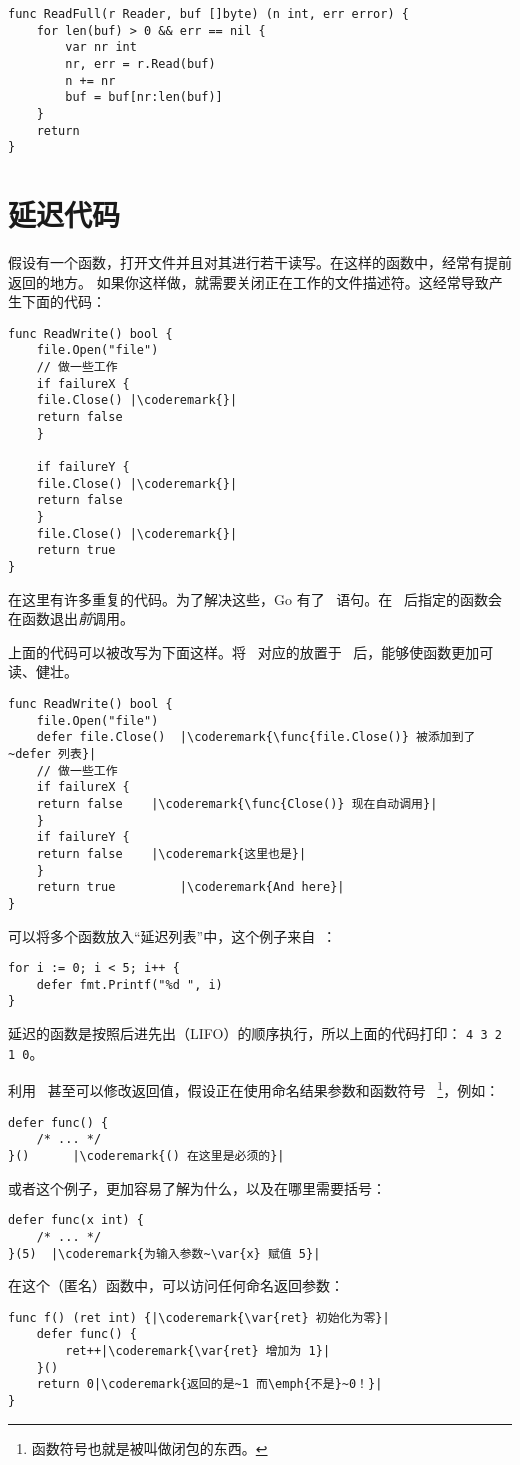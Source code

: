 \begin{lstlisting}
func ReadFull(r Reader, buf []byte) (n int, err error) {
    for len(buf) > 0 && err == nil {
        var nr int
        nr, err = r.Read(buf)
        n += nr
        buf = buf[nr:len(buf)]
    }
    return
}
\end{lstlisting}

\section{延迟代码}
\label{sec:deferred code}
假设有一个函数，打开文件并且对其进行若干读写。在这样的函数中，经常有提前返回的地方。
如果你这样做，就需要关闭正在工作的文件描述符。这经常导致产生下面的代码：
\begin{lstlisting}[caption=没有 defer]
func ReadWrite() bool {
    file.Open("file")
    // 做一些工作
    if failureX {
	file.Close() |\coderemark{}|
	return false
    }

    if failureY {
	file.Close() |\coderemark{}|
	return false
    }
    file.Close() |\coderemark{}|
    return true
}
\end{lstlisting}
在这里有许多重复的代码。为了解决这些，Go 有了~ 
语句。在~ 后指定的函数会在函数退出\emph{前}调用。

上面的代码可以被改写为下面这样。将~ 对应的放置于~ 
后，能够使函数更加可读、健壮。
\begin{lstlisting}[caption=有 defer]
func ReadWrite() bool {
    file.Open("file")
    defer file.Close()	|\coderemark{\func{file.Close()} 被添加到了~defer 列表}|
    // 做一些工作
    if failureX {
	return false    |\coderemark{\func{Close()} 现在自动调用}|
    }
    if failureY {
	return false    |\coderemark{这里也是}|
    }
    return true         |\coderemark{And here}|
}
\end{lstlisting}
可以将多个函数放入``延迟列表''中，这个例子来自~\cite{effective_go}：
\begin{lstlisting}
for i := 0; i < 5; i++ { 
    defer fmt.Printf("%d ", i) 
} 
\end{lstlisting}
延迟的函数是按照后进先出（LIFO）的顺序执行，所以上面的代码打印：
\lstinline{4 3 2 1 0}。

利用~ 甚至可以修改返回值，假设正在使用命名结果参数和函数符号
~\footnote{函数符号也就是被叫做闭包的东西。}，例如：
\begin{lstlisting}[caption=函数符号]
defer func() {
	/* ... */
}()		 |\coderemark{() 在这里是必须的}|
\end{lstlisting}
或者这个例子，更加容易了解为什么，以及在哪里需要括号：
\begin{lstlisting}[caption=带参数的函数符号]
defer func(x int) {
	/* ... */
}(5)  |\coderemark{为输入参数~\var{x} 赋值 5}|
\end{lstlisting}
在这个（匿名）函数中，可以访问任何命名返回参数：
\begin{lstlisting}[caption=在 defer 中访问返回值]
func f() (ret int) {|\coderemark{\var{ret} 初始化为零}|
	defer func() {
		ret++|\coderemark{\var{ret} 增加为 1}|
	}()
	return 0|\coderemark{返回的是~1 而\emph{不是}~0！}|
}
\end{lstlisting}


